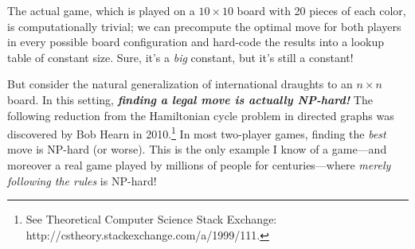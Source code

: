 The actual game, which is played on a $10 \times 10$ board with 20 pieces of each color, is computationally trivial; we can precompute the optimal move for both players in every possible board configuration and hard-code the results into a lookup table of constant size.
Sure, it’s a \textit{big} constant, but it’s still a constant!

But consider the natural generalization of international draughts to an $n \times n$ board.
In this setting, \textbf{\textit{finding a legal move is actually NP-hard!}}
The following reduction from the Hamiltonian cycle problem in directed graphs was discovered by Bob Hearn in 2010.\footnote{See Theoretical Computer Science Stack Exchange: http://cstheory.stackexchange.com/a/1999/111.}
In most two-player games, finding the \textit{best} move is NP-hard (or worse).
This is the only example I know of a game---and moreover a real game played by millions of people for centuries---where \textit{merely following the rules} is NP-hard!

